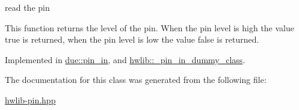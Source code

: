 read the pin 

This function returns the level of the pin. When the pin level is high the value true is returned, when the pin level is low the value false is returned. 

Implemented in \hyperlink{classdue_1_1pin__in_abfadd4fd4c1aef21c1243bc69ce55b1c}{due\+::pin\+\_\+in}, and \hyperlink{classhwlib_1_1__pin__in__dummy__class_a2b51c1a0d291cd4414e70504d388c9cb}{hwlib\+::\+\_\+pin\+\_\+in\+\_\+dummy\+\_\+class}.



The documentation for this class was generated from the following file\+:\begin{DoxyCompactItemize}
\item 
\hyperlink{hwlib-pin_8hpp}{hwlib-\/pin.\+hpp}\end{DoxyCompactItemize}

